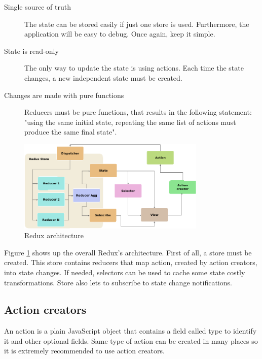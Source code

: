\begin{description}
	\item [Single source of truth]
	The state can be stored easily if just one store is used. Furthermore, the
	application will be easy to debug. Once again, keep it simple.
	
	\item [State is read-only]
	The only way to update the state is using actions. Each time the state
	changes, a new independent state must be created.

	\item [Changes are made with pure functions]
	Reducers must be pure functions, that results in the following statement:
	"using the same initial state, repeating the same list of actions must
	produce the same final state".

\end{description}

\begin{figure}[htb]
	\begin{center}
		\includegraphics[width=0.8\textwidth]{./figures/redux.png}
		\caption{Redux architecture}
		\label{F:redux-architecture}
	\end{center}
\end{figure}

Figure \ref{F:redux-architecture} shows up the overall Redux's architecture.
First of all, a store must be created. This store contains reducers that map
action, created by action creators, into state changes. If needed, selectors
can be used to cache some state costly transformations. Store also lets 
to subscribe to state change notifications.

\subsection{Action creators}

An action is a plain JavaScript object that contains a field called type to 
identify it and other optional fields. Same type of action can be created in
many places so it is extremely recommended to use action creators.

